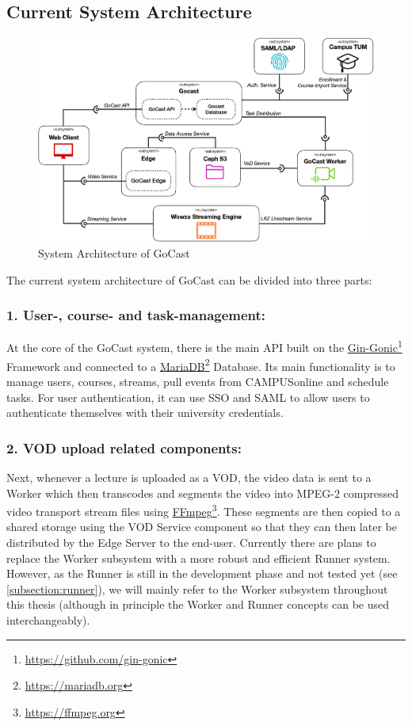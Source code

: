 \subsection{Current System Architecture}

\begin{figure}[htpb]
    \centering
    \includegraphics[width=\linewidth]{images/ssd-new.png}
    \caption[System Architecture of GoCast]{System Architecture of GoCast}\label{fig:old-system-architecture}
\end{figure}

The current system architecture of GoCast can be divided into three parts:

\subsubsection{1. User-, course- and task-management:}
At the core of the GoCast system, there is the main \ac{API} built on the \href{https://github.com/gin-gonic/gin}{Gin-Gonic}\footnote{\url{https://github.com/gin-gonic}} Framework and connected to a \href{https://mariadb.org}{MariaDB}\footnote{\url{https://mariadb.org}} Database. Its main functionality is to manage users, courses, streams, pull events from CAMPUSonline and schedule tasks. For user authentication, it can use \ac{SSO} and \ac{SAML} to allow users to authenticate themselves with their university credentials.

\subsubsection{2. \ac{VOD} upload related components:}
Next, whenever a lecture is uploaded as a VOD, the video data is sent to a Worker which then transcodes and segments the video into MPEG-2 compressed video transport stream files using \href{https://ffmpeg.org/}{FFmpeg}\footnote{\url{https://ffmpeg.org}}. These segments are then copied to a shared storage using the VOD Service component so that they can then later be distributed by the Edge Server to the end-user.
Currently there are plans to replace the Worker subsystem with a more robust and efficient Runner system. However, as the Runner is still in the development phase and not tested yet (see \autoref{subsection:runner}), we will mainly refer to the Worker subsystem throughout this thesis (although in principle the Worker and Runner concepts can be used interchangeably).

